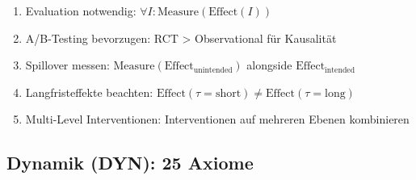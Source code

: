 \begin{enumerate}[label=MA-GOV-\arabic*:, leftmargin=3cm]
    \item Evaluation notwendig: $\forall I: \text{Measure}(\text{Effect}(I))$
    \item A/B-Testing bevorzugen: RCT > Observational für Kausalität
    \item Spillover messen: $\text{Measure}(\text{Effect}_{\text{unintended}})$ alongside $\text{Effect}_{\text{intended}}$
    \item Langfristeffekte beachten: $\text{Effect}(\tau=\text{short}) \neq \text{Effect}(\tau=\text{long})$
    \item Multi-Level Interventionen: Interventionen auf mehreren Ebenen kombinieren
\end{enumerate}

\subsection{Dynamik (DYN): 25 Axiome}
